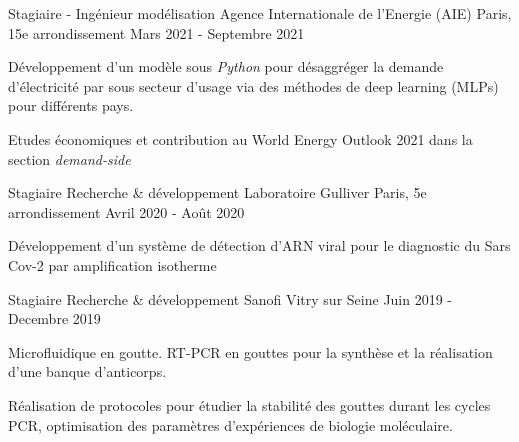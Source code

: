 \begin{cventries}
  \cventry
    {Stagiaire - Ingénieur modélisation} %
    {Agence Internationale de l'Energie (AIE)} %
    {Paris, 15e arrondissement} %
    {Mars 2021 - Septembre 2021} %
    {
      \begin{cvitems} %
        \item {Développement d'un modèle sous \textit{Python} pour désaggréger la demande d'électricité par sous secteur d'usage via des méthodes de deep learning (MLPs) pour différents pays. }
        \item {Etudes économiques et contribution au World Energy Outlook 2021 dans la section \textit{demand-side}}
      \end{cvitems}
    }
    

  \cventry
    {Stagiaire Recherche \& développement} %
    {Laboratoire Gulliver} %
    {Paris, 5e arrondissement} %
    {Avril 2020 - Août 2020} %
    {
      \begin{cvitems} %
        \item {Développement d'un système de détection d'ARN viral pour le diagnostic du Sars Cov-2 par amplification isotherme}
      \end{cvitems}
    }

  \cventry
    {Stagiaire Recherche \& développement} %
    {Sanofi} %
    {Vitry sur Seine} %
    {Juin 2019 - Decembre 2019} %
    {
      \begin{cvitems} %
        \item {Microfluidique en goutte. RT-PCR en gouttes pour la synthèse et la réalisation d'une banque d'anticorps.}
        \item {Réalisation de protocoles pour étudier la stabilité des gouttes durant les cycles PCR, optimisation des paramètres d'expériences de biologie moléculaire.  }
      \end{cvitems}
    }
\end{cventries}
